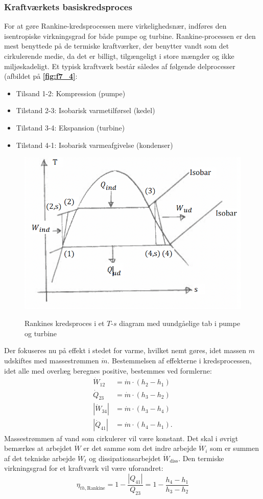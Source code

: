 \subsubsection{Kraftværkets basiskredsproces}
For at gøre Rankine-kredsprocessen mere virkelighedsnær, indføres den isentropiske virkningsgrad for både pumpe og turbine. Rankine-processen er den mest benyttede på de termiske kraftværker, der benytter vandt som det cirkulerende medie, da det er billigt, tilgængeligt i store mængder og ikke miljøskadeligt. Et typisk kraftværk består således af følgende delprocesser (afbildet på \textbf{\autoref{fig:f7_4}}:
\begin{itemize}
  \item Tilsand 1-2: Kompression (pumpe)
  \item Tilstand 2-3: Isobarisk varmetilførsel (kedel)
  \item Tilstand 3-4: Ekspansion (turbine)
  \item Tilstand 4-1: Isobarisk varmeafgivelse (kondenser)
\end{itemize}
\begin{figure} [ht]
  \centering
  \caption{Rankines kredsproces i et $T$-$s$ diagram med uundgåelige tab i pumpe og turbine}
  \includegraphics[width=0.5\linewidth]{./figures/f7_4.png}
  \label{fig:f7_4}
\end{figure}

Der fokuseres nu på effekt i stedet for varme, hvilket nemt gøres, idet massen $m$ udskiftes med massestrømmen $\dot{m}$. Bestemmelsen af effekterne i kredsprocessen, idet alle med overlæg beregnes positive, bestemmes ved formlerne:
\begin{align*}
  \dot{W}_{12} &= \dot{m} \cdot \left( h_2 - h_1 \right) \\
  \dot{Q}_{23} &= \dot{m} \cdot \left( h_3 - h_2 \right) \\
  \left| \dot{W}_{34} \right| &= \dot{m} \cdot \left( h_3 - h_4 \right) \\
  \left| \dot{Q}_{41} \right| &= \dot{m} \cdot \left( h_4 - h_1 \right)
.\end{align*}
Massestrømmen af vand som cirkulerer vil være konstant. Det skal i øvrigt bemærkes at arbejdet $\dot{W}$ er det samme som det indre arbejde $\dot{W}_i$ som er summen af det tekniske arbejde $\dot{W}_t$ og dissipationsarbejdet $\dot{W}_{\mathrm{diss}}$. Den termiske virkningsgrad for et kraftværk vil være uforandret:
\begin{equation} \label{eq:virkRan}
  \eta_{th, \mathrm{Rankine}} = 1 - \frac{\left| Q_{41} \right|}{Q_{23}} = 1 - \frac{h_4 - h_1}{h_3 - h_2}
\end{equation}

